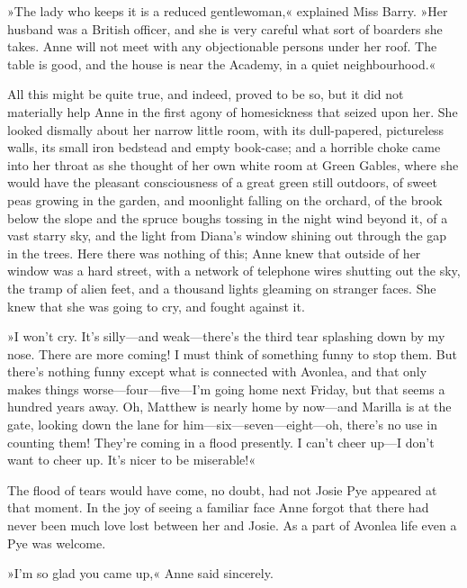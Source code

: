 »The lady who keeps it is a reduced gentlewoman,« explained Miss Barry. »Her husband was a British officer, and she is very careful what sort of boarders she takes. Anne will not meet with any objectionable persons under her roof. The table is good, and the house is near the Academy, in a quiet neighbourhood.«

All this might be quite true, and indeed, proved to be so, but it did not materially help Anne in the first agony of homesickness that seized upon her. She looked dismally about her narrow little room, with its dull-papered, pictureless walls, its small iron bedstead and empty book-case; and a horrible choke came into her throat as she thought of her own white room at Green Gables, where she would have the pleasant consciousness of a great green still outdoors, of sweet peas growing in the garden, and moonlight falling on the orchard, of the brook below the slope and the spruce boughs tossing in the night wind beyond it, of a vast starry sky, and the light from Diana's window shining out through the gap in the trees. Here there was nothing of this; Anne knew that outside of her window was a hard street, with a network of telephone wires shutting out the sky, the tramp of alien feet, and a thousand lights gleaming on stranger faces. She knew that she was going to cry, and fought against it.

»I won't cry. It's silly—and weak—there's the third tear splashing down by my nose. There are more coming! I must think of something funny to stop them. But there's nothing funny except what is connected with Avonlea, and that only makes things worse—four—five—I'm going home next Friday, but that seems a hundred years away. Oh, Matthew is nearly home by now—and Marilla is at the gate, looking down the lane for him—six—seven—eight—oh, there's no use in counting them! They're coming in a flood presently. I can't cheer up—I don't want to cheer up. It's nicer to be miserable!«

The flood of tears would have come, no doubt, had not Josie Pye appeared at that moment. In the joy of seeing a familiar face Anne forgot that there had never been much love lost between her and Josie. As a part of Avonlea life even a Pye was welcome.

»I'm so glad you came up,« Anne said sincerely.

